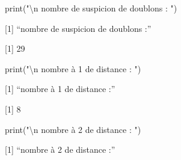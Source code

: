 \documentclass[
]{article}
\newenvironment{Shaded}{\begin{snugshade}}{\end{snugshade}}
\newcommand{\DecValTok}[1]{\textcolor[rgb]{0.00,0.00,0.81}{#1}}
\newcommand{\FunctionTok}[1]{\textcolor[rgb]{0.00,0.00,0.00}{#1}}
\newcommand{\NormalTok}[1]{#1}
\newcommand{\SpecialCharTok}[1]{\textcolor[rgb]{0.00,0.00,0.00}{#1}}
\newcommand{\StringTok}[1]{\textcolor[rgb]{0.31,0.60,0.02}{#1}}
\begin{document}
\begin{Shaded}
\begin{Highlighting}[]
\FunctionTok{print}\NormalTok{(}\StringTok{"}\SpecialCharTok{\textbackslash{}n}\StringTok{ nombre de suspicion de doublons : "}\NormalTok{)}
\end{Highlighting}
\end{Shaded}

{[}1{]} ``\n nombre de suspicion de doublons :''

\begin{Shaded}
\end{Shaded}

{[}1{]} 29

\begin{Shaded}
\begin{Highlighting}[]
\FunctionTok{print}\NormalTok{(}\StringTok{"}\SpecialCharTok{\textbackslash{}n}\StringTok{ nombre à 1 de distance : "}\NormalTok{)}
\end{Highlighting}
\end{Shaded}

{[}1{]} ``\n nombre à 1 de distance :''

\begin{Shaded}
\end{Shaded}

{[}1{]} 8

\begin{Shaded}
\begin{Highlighting}[]
\FunctionTok{print}\NormalTok{(}\StringTok{"}\SpecialCharTok{\textbackslash{}n}\StringTok{ nombre à 2 de distance : "}\NormalTok{)}
\end{Highlighting}
\end{Shaded}

{[}1{]} ``\n nombre à 2 de distance :''

\begin{Shaded}
\end{Shaded}
\end{document}
